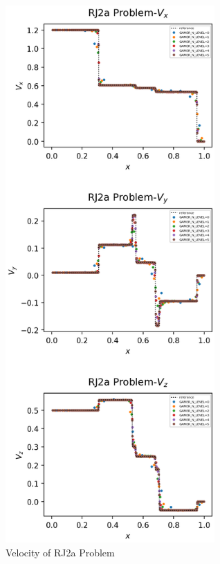 \documentclass[a4paper,10pt]{article}
\begin{document}
\begin{figure}[htbp] %
\centering %
\includegraphics[width=8cm]{velocity_2.png} %
\caption{Velocity of RJ2a Problem}
\end{figure}
\end{document}
